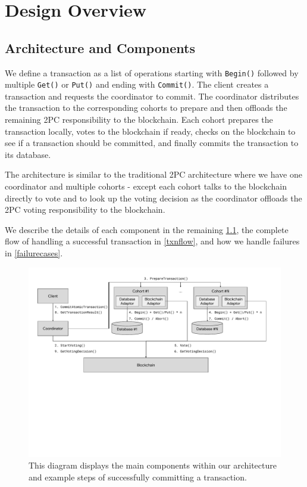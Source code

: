\documentclass[11pt,sigplan,screen,nonacm]{acmart}
\begin{document}
\section{Design Overview}
\subsection{Architecture and Components} \label{components}

We define a transaction as a list of operations starting with \texttt{Begin()} followed by multiple \texttt{Get()} or \texttt{Put()} and ending with \texttt{Commit()}. The client creates a transaction and requests the coordinator to commit. The coordinator distributes the transaction to the corresponding cohorts to prepare and then offloads the remaining 2PC responsibility to the blockchain. Each cohort prepares the transaction locally, votes to the blockchain if ready, checks on the blockchain to see if a transaction should be committed, and finally commits the transaction to its database.

The architecture is similar to the traditional 2PC architecture where we have one coordinator and multiple cohorts - except each cohort talks to the blockchain directly to vote and to look up the voting decision as the coordinator offloads the 2PC voting responsibility to the blockchain.

We describe the details of each component in the remaining \ref{components}, the complete flow of handling a successful transaction in \ref{txnflow}, and how we handle failures in \ref{failurecases}.

\begin{figure}
  \centering
  \includegraphics[width=\textwidth]{./diagram.pdf}
  \caption{This diagram displays the main components within our architecture and example steps of successfully committing a transaction.}
  \label{fig:Panel}
\end{figure}
\end{document}
